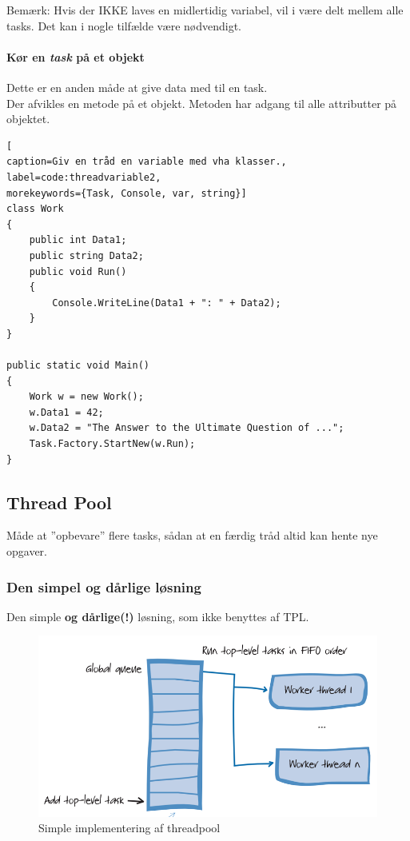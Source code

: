 Bemærk: Hvis der IKKE laves en midlertidig variabel, vil i være delt mellem alle tasks. Det kan i nogle tilfælde være nødvendigt.

\paragraph{Kør en \textit{task} på et objekt}
Dette er en anden måde at give data med til en task.\\

Der afvikles en metode på et objekt. Metoden har adgang til alle attributter på objektet.

\begin{lstlisting}[
caption=Giv en tråd en variable med vha klasser.,
label=code:threadvariable2,
morekeywords={Task, Console, var, string}]
class Work
{
	public int Data1;
	public string Data2;
	public void Run()
	{
		Console.WriteLine(Data1 + ": " + Data2);
	}
}

public static void Main()
{
	Work w = new Work();
	w.Data1 = 42;
	w.Data2 = "The Answer to the Ultimate Question of ...";
	Task.Factory.StartNew(w.Run);
}
\end{lstlisting}

\subsection{Thread Pool}
Måde at ''opbevare'' flere tasks, sådan at en færdig tråd altid kan hente nye opgaver.

\subsubsection{Den simpel og dårlige løsning}
Den simple \textbf{og dårlige(!)} løsning, som ikke benyttes af TPL. 

\begin{figure}[h]
	\centering
	\includegraphics[width=0.7\linewidth]{figs/badthreadpool}
	\caption{Simple implementering af threadpool}
	\label{fig:badthreadpool}
\end{figure}


